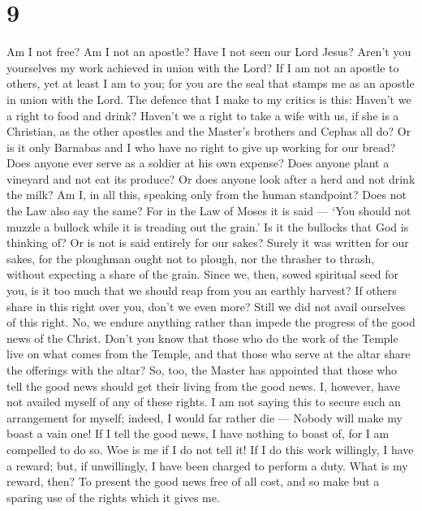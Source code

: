\hypertarget{section-8}{%
\section{9}\label{section-8}}

 Am I not free? Am I not an apostle? Have I not seen our
Lord Jesus? Aren't you yourselves my work achieved in union with the
Lord?  If I am not an apostle to others, yet at least I am
to you; for you are the seal that stamps me as an apostle in union with
the Lord.  The defence that I make to my critics is this:
 Haven't we a right to food and drink?  Haven't
we a right to take a wife with us, if she is a Christian, as the other
apostles and the Master's brothers and Cephas all do?  Or is
it only Barnabas and I who have no right to give up working for our
bread?  Does anyone ever serve as a soldier at his own
expense? Does anyone plant a vineyard and not eat its produce? Or does
anyone look after a herd and not drink the milk?  Am I, in
all this, speaking only from the human standpoint? Does not the Law also
say the same?  For in the Law of Moses it is said --- `You
should not muzzle a bullock while it is treading out the grain.' Is it
the bullocks that God is thinking of?  Or is not is said
entirely for our sakes? Surely it was written for our sakes, for the
ploughman ought not to plough, nor the thrasher to thrash, without
expecting a share of the grain.  Since we, then, sowed
spiritual seed for you, is it too much that we should reap from you an
earthly harvest?  If others share in this right over you,
don't we even more? Still we did not avail ourselves of this right. No,
we endure anything rather than impede the progress of the good news of
the Christ.  Don't you know that those who do the work of
the Temple live on what comes from the Temple, and that those who serve
at the altar share the offerings with the altar?  So, too,
the Master has appointed that those who tell the good news should get
their living from the good news.  I, however, have not
availed myself of any of these rights. I am not saying this to secure
such an arrangement for myself; indeed, I would far rather die ---
Nobody will make my boast a vain one!  If I tell the good
news, I have nothing to boast of, for I am compelled to do so. Woe is me
if I do not tell it!  If I do this work willingly, I have a
reward; but, if unwillingly, I have been charged to perform a duty.
 What is my reward, then? To present the good news free of
all cost, and so make but a sparing use of the rights which it gives me.

